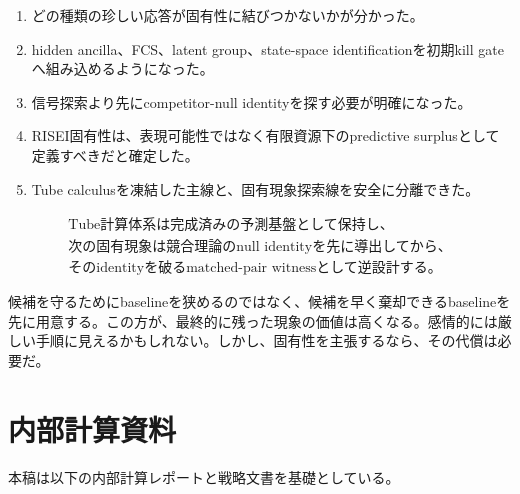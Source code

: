 \documentclass[11pt,a4paper,uplatex,dvipdfmx]{bxjsarticle}
\theoremstyle{remark}
\begin{document}
\begin{enumerate}
  \item どの種類の珍しい応答が固有性に結びつかないかが分かった。
  \item hidden ancilla、FCS、latent group、state-space identificationを初期kill gateへ組み込めるようになった。
  \item 信号探索より先にcompetitor-null identityを探す必要が明確になった。
  \item RISEI固有性は、表現可能性ではなく有限資源下のpredictive surplusとして定義すべきだと確定した。
  \item Tube calculusを凍結した主線と、固有現象探索線を安全に分離できた。
\end{enumerate}

\begin{resultbox}[研究方針の一文要約]
\begin{equation}
\boxed{
\begin{gathered}
\text{Tube計算体系は完成済みの予測基盤として保持し、}\\
\text{次の固有現象は競合理論のnull identityを先に導出してから、}\\
\text{そのidentityを破るmatched-pair witnessとして逆設計する。}
\end{gathered}}
\end{equation}
\end{resultbox}

候補を守るためにbaselineを狭めるのではなく、候補を早く棄却できるbaselineを先に用意する。この方が、最終的に残った現象の価値は高くなる。感情的には厳しい手順に見えるかもしれない。しかし、固有性を主張するなら、その代償は必要だ。

\appendix

\section{内部計算資料}

本稿は以下の内部計算レポートと戦略文書を基礎としている。
\end{document}
